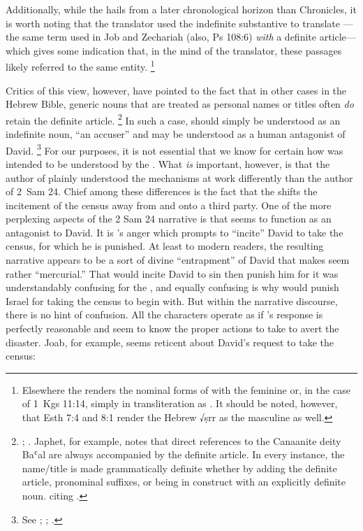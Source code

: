 Additionally, while the \lxx hails from a later chronological horizon than Chronicles, it is worth noting that the translator used the indefinite substantive  to translate ---the same term used in Job and Zechariah (also, Ps 108:6) \emph{with} a definite article---which gives some indication that, in the mind of the translator, these passages likely referred to the same entity.%
    \footnote{Elsewhere the \lxx renders the nominal forms of  with the feminine  or, in the case of 1~Kgs 11:14, simply in transliteration as . It should be noted, however, that Esth 7:4 and 8:1 render the Hebrew √ṣrr as the masculine  as well.} 

 Critics of this view, however, have pointed to the fact that in other cases in the Hebrew Bible, generic nouns that are treated as personal names or titles often \emph{do} retain the definite article.%
    \footnote{\cite[114--117]{japhet2009};
        \cite[370--390]{japhet1993}. Japhet, for example, notes that direct references to the Canaanite deity Baʿal are always accompanied by the definite article. In every instance, the name/title  is made grammatically definite whether by adding the definite article, pronominal suffixes, or being in construct with an explicitly definite noun. 
        \cite[115]{japhet2009} citing 
        \cite[§126d]{gkc}.}
In such a case,  should simply be understood as an indefinite noun, ``an accuser'' and may be understood as a human antagonist of David.%
    \footnote{See 
        \cite{stokes_jbl2009};
        \cite[114--117]{japhet2009}; 
        \cite[370--390]{japhet1993}.} 
For our purposes, it is not essential that we know for certain how  was intended to be understood by the \chronicler. What \emph{is} important, however, is that the author of \chronicles plainly understood the mechanisms at work differently than the author of 2~Sam 24. Chief among these differences is the fact that the \chronicler shifts the incitement of the census away from \yahweh and onto a third party. One of the more perplexing aspects of the 2 Sam 24 narrative is that \yahweh seems to function as an antagonist to David. It is \yahweh's anger which prompts \yahweh to ``incite'' David to take the census, for which he is punished. At least to modern readers, the resulting narrative appears to be a sort of divine ``entrapment'' of David that makes \yahweh seem rather ``mercurial.''%
    \autocite[4]{rollston_keith-stuckenbruck2016}
That \yahweh would incite David to sin then punish him for it was understandably confusing for the \chronicler, and equally confusing is why \yahweh would punish Israel for taking the census to begin with. But within the narrative discourse, there is no hint of confusion. All the characters operate as if \yahweh's response is perfectly reasonable and seem to know the proper actions to take to avert the disaster. Joab, for example, seems reticent about David's request to take the census:
